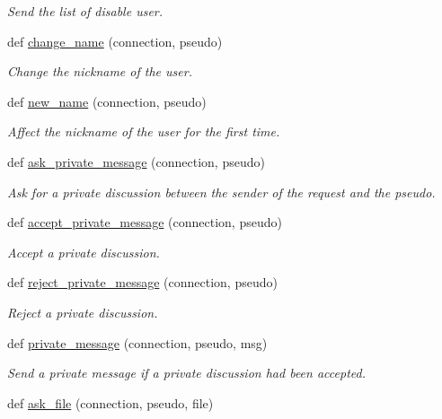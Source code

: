 \begin{DoxyCompactItemize}
\begin{DoxyCompactList}\small\item\em Send the list of disable user. \end{DoxyCompactList}\item 
def \hyperlink{namespace_server_a59bc6f10d51dddca1906c85fdac1cc62}{change\+\_\+name} (connection, pseudo)
\begin{DoxyCompactList}\small\item\em Change the nickname of the user. \end{DoxyCompactList}\item 
def \hyperlink{namespace_server_aedccc2662d6bc5892f70e48009ed1b59}{new\+\_\+name} (connection, pseudo)
\begin{DoxyCompactList}\small\item\em Affect the nickname of the user for the first time. \end{DoxyCompactList}\item 
def \hyperlink{namespace_server_a46ba24f249f2961ada72160f9a9ba9b8}{ask\+\_\+private\+\_\+message} (connection, pseudo)
\begin{DoxyCompactList}\small\item\em Ask for a private discussion between the sender of the request and the pseudo. \end{DoxyCompactList}\item 
def \hyperlink{namespace_server_a1879fdb42898934db420d6c225db536e}{accept\+\_\+private\+\_\+message} (connection, pseudo)
\begin{DoxyCompactList}\small\item\em Accept a private discussion. \end{DoxyCompactList}\item 
def \hyperlink{namespace_server_a1ccbd55ee3033925a2b1ef2716dd0829}{reject\+\_\+private\+\_\+message} (connection, pseudo)
\begin{DoxyCompactList}\small\item\em Reject a private discussion. \end{DoxyCompactList}\item 
def \hyperlink{namespace_server_a5605c682f147e7cf9018ac02bb089989}{private\+\_\+message} (connection, pseudo, msg)
\begin{DoxyCompactList}\small\item\em Send a private message if a private discussion had been accepted. \end{DoxyCompactList}\item 
def \hyperlink{namespace_server_a2ddcf35a85844615fa31e72f6dcc52b0}{ask\+\_\+file} (connection, pseudo, file)

\end{DoxyCompactItemize}

